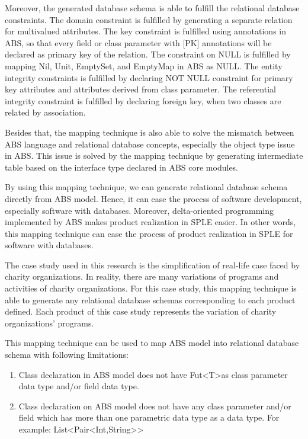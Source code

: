 \documentclass[runningheads,a4paper]{llncs}
\begin{document}
Moreover, the generated database schema is able to fulfill the relational database constraints. The domain constraint is fulfilled by generating a separate relation for multivalued attributes. The key constraint is fulfilled using annotations in ABS, so that every field or class parameter with [PK] annotations will be declared as primary key of the relation. The constraint on NULL is fulfilled by mapping Nil, Unit, EmptySet, and EmptyMap in ABS as NULL. The entity integrity constraints is fulfilled by declaring NOT NULL constraint for primary key attributes and attributes derived from class parameter. The referential integrity constraint is fulfilled by declaring foreign key, when two classes are related by association. 

Besides that, the mapping technique is also able to solve the mismatch between ABS language and relational database concepts, especially the object type issue in ABS. This issue is solved by the mapping technique by generating intermediate table based on the interface type declared in ABS core modules.

By using this mapping technique, we can generate relational database schema directly from ABS model. Hence, it can ease the process of software development, especially software with databases. Moreover, delta-oriented programming implemented by ABS makes product realization in SPLE easier. In other words, this mapping technique can ease the process of product realization in SPLE for software with databases.
 
The case study used in this research is the simplification of real-life case faced by charity organizations. In reality, there are many variations of programs and activities of charity organizations. For this case study, this mapping technique is able to generate any relational database schemas corresponding to each product defined. Each product of this case study represents the variation of charity organizations’ programs.

This mapping technique can be used to map ABS model into relational database schema with following limitations:
 
\begin{enumerate}
	\item Class declaration in ABS model does not have Fut\textless T\textgreater as class parameter data type and/or field data type.
	\item Class declaration on ABS model does not have any class parameter and/or field which has more than one parametric data type as a data type.
	For example: List\textless Pair\textless Int,String\textgreater \textgreater
\end{enumerate}
\end{document}
